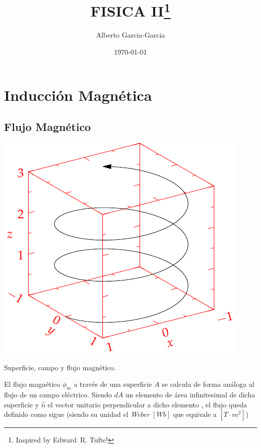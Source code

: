 \documentclass{tufte-handout}
\title{FISICA II\thanks{Inspired by Edward~R. Tufte!}}
\author[Alberto Garcia-Garcia]{Alberto Garcia-Garcia}
\date{\today}  %
\begin{document}
\maketitle%

\begin{abstract}
%
\end{abstract}

\section{Inducción Magnética}

\subsection{Flujo Magnético}

\begin{marginfigure}%
    \includegraphics[width=\linewidth]{helix}
    \caption{Superficie, campo y flujo magnético.}
    \label{fig:flujomagnetico}
\end{marginfigure}

El flujo magnético $\phi_m$ a través de una superficie $A$ se calcula de forma análoga al flujo de un campo eléctrico. Siendo $dA$ un elemento de área infinitesimal de dicha superficie y $\hat{n}$ el vector unitario perpendicular a dicho elemento , el flujo queda definido como sigue (siendo su unidad el \emph{Weber} $[Wb]$ que equivale a $[T\cdot m^2]$)
\end{document}
